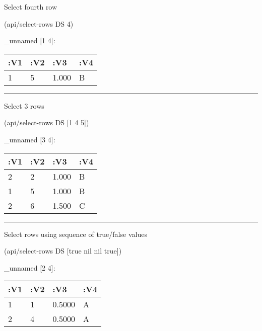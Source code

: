 \documentclass[]{article}
\newenvironment{Shaded}{\begin{snugshade}}{\end{snugshade}}
\newcommand{\DecValTok}[1]{\textcolor[rgb]{0.00,0.00,0.81}{#1}}
\newcommand{\VariableTok}[1]{\textcolor[rgb]{0.00,0.00,0.00}{#1}}
\newcommand{\NormalTok}[1]{#1}
\begin{document}
Select fourth row

\begin{Shaded}
\begin{Highlighting}[]
\NormalTok{(api/select-rows DS }\DecValTok{4}\NormalTok{)}
\end{Highlighting}
\end{Shaded}

\_unnamed {[}1 4{]}:

\begin{longtable}[]{@{}llll@{}}
\toprule
:V1 & :V2 & :V3 & :V4\tabularnewline
\midrule
\endhead
1 & 5 & 1.000 & B\tabularnewline
\bottomrule
\end{longtable}

\begin{center}\rule{0.5\linewidth}{0.5pt}\end{center}

Select 3 rows

\begin{Shaded}
\begin{Highlighting}[]
\NormalTok{(api/select-rows DS [}\DecValTok{1} \DecValTok{4} \DecValTok{5}\NormalTok{])}
\end{Highlighting}
\end{Shaded}

\_unnamed {[}3 4{]}:

\begin{longtable}[]{@{}llll@{}}
\toprule
:V1 & :V2 & :V3 & :V4\tabularnewline
\midrule
\endhead
2 & 2 & 1.000 & B\tabularnewline
1 & 5 & 1.000 & B\tabularnewline
2 & 6 & 1.500 & C\tabularnewline
\bottomrule
\end{longtable}

\begin{center}\rule{0.5\linewidth}{0.5pt}\end{center}

Select rows using sequence of true/false values

\begin{Shaded}
\begin{Highlighting}[]
\NormalTok{(api/select-rows DS [}\VariableTok{true} \VariableTok{nil} \VariableTok{nil} \VariableTok{true}\NormalTok{])}
\end{Highlighting}
\end{Shaded}

\_unnamed {[}2 4{]}:

\begin{longtable}[]{@{}llll@{}}
\toprule
:V1 & :V2 & :V3 & :V4\tabularnewline
\midrule
\endhead
1 & 1 & 0.5000 & A\tabularnewline
2 & 4 & 0.5000 & A\tabularnewline
\bottomrule
\end{longtable}
\end{document}
